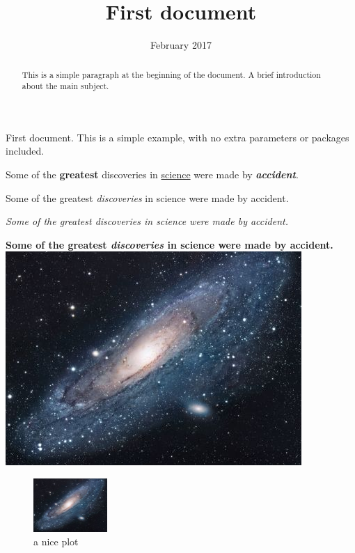 \documentclass[sigconf,review, anonymous]{acmart}
\title{First document}
\date{February 2017}
\begin{document}
\maketitle
First document. This is a simple example, with no extra parameters or packages included.
\linenumbers


\begin{abstract}
This is a simple paragraph at the beginning of the 
document. A brief introduction about the main subject.
\end{abstract}

Some of the \textbf{greatest}
discoveries in \underline{science} 
were made by \textbf{\textit{accident}}.

Some of the greatest \emph{discoveries} 
in science 
were made by accident.

\textit{Some of the greatest \emph{discoveries} 
in science 
were made by accident.}

\textbf{Some of the greatest \emph{discoveries} 
in science 
were made by accident.}
\includegraphics{universe}
\begin{figure}[h]
    \centering
    \includegraphics[width=0.25\textwidth]{universe}
    \caption{a nice plot}
    \label{fig:mesh1}
\end{figure}
\end{document}
